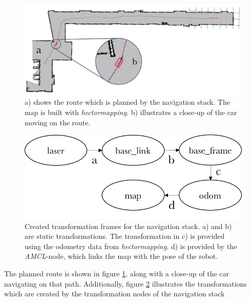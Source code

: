 \documentclass[conference,a4paper]{IEEEtran}
\begin{document}
\begin{figure}[!t]
	\includegraphics[width=\columnwidth]{navstack_result_1}
	\centering
	\caption{a) shows the route which is planned by the navigation stack. The map is built with \emph{hector\textunderscore mapping}\cite{Kohlbrecher2012}. b) illustrates a close-up of the car moving on the route. }
	\label{fig:navstack_result}
\end{figure}

\begin{figure}[!t]
	\includegraphics[width=\columnwidth]{navstack_tf2}
	\centering
	\caption{Created transformation frames for the navigation stack. a) and b) are static transformations. The transformation in c) is provided using the odometry data from \emph{hector\textunderscore mapping}. d) is provided by the \emph{AMCL}-node, which links the map with the pose of the robot.}
	\label{fig:navstack_tf}
\end{figure}

The planned route is shown in figure \ref{fig:navstack_result}, along with a close-up of the car navigating on that path. Additionally, figure \ref{fig:navstack_tf} illustrates the transformations which are created by the transformation nodes of the navigation stack
\end{document}
